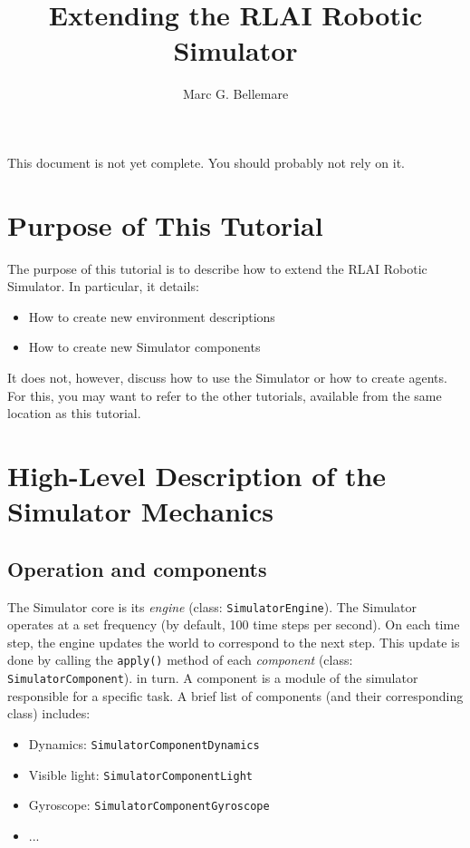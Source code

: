 \documentclass[12pt]{article}
\author{Marc G. Bellemare}
\title{Extending the RLAI Robotic Simulator}
\newcommand{\code}[1]{\texttt{#1}}
\newcommand{\keyword}[1]{\textit{#1}}
\begin{document}
\maketitle

This document is not yet complete. You should probably not rely on it.

\section{Purpose of This Tutorial}

The purpose of this tutorial is to describe how to extend the RLAI Robotic
Simulator. In particular, it details:

\begin{itemize}
\item{How to create new environment descriptions}
\item{How to create new Simulator components}
\end{itemize}

It does not, however, discuss how to use the Simulator or how to create agents.
For this, you may want to refer to the other tutorials, available from the
same location as this tutorial.


\section{High-Level Description of the Simulator Mechanics}

\subsection{Operation and components}

The Simulator core is its \keyword{engine} (class: \code{SimulatorEngine}). 
The Simulator operates at a set 
frequency (by default, 100 time steps per second). On each time step, the
engine updates the world to correspond to the next step. This update is done
by calling the \code{apply()} method of each \keyword{component} 
(class: \code{SimulatorComponent}). in turn. A component 
is a module of the simulator responsible for a specific task. A brief list
of components (and their corresponding class) includes:

\begin{itemize}
  \item{Dynamics: \code{SimulatorComponentDynamics}}
  \item{Visible light: \code{SimulatorComponentLight}}
  \item{Gyroscope: \code{SimulatorComponentGyroscope}}
  \item{...}
\end{itemize}
\end{document}
